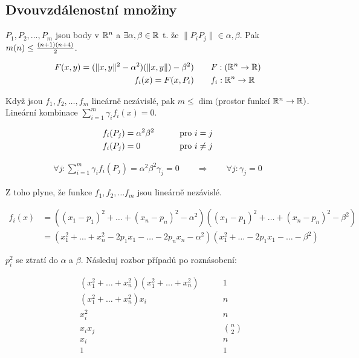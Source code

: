 \subsection{Dvouvzdálenostní množiny}


\vt $P_1, P_2, \dots, P_m$ jsou body v $\mathbb{R}^n$ a $\exists \alpha, \beta \in \mathbb{R}$ t. že $\|P_iP_j\| \in {\alpha, \beta}$. Pak $m(n) \leq {(n+1)(n+4)\over 2}$.

\dk
\begin{align}
F(x,y) = (\|x,y\|^2-\alpha^2)(\|x,y\|)-\beta^2)&\qquad F: (\mathbb{R}^n \rightarrow \mathbb{R}) \\
f_i(x) = F(x, P_i)&\qquad f_i: \mathbb{R}^n \rightarrow \mathbb{R}
\end{align}

Když jsou $f_1, f_2, \dots, f_m$ lineárně nezávislé, pak $m \leq \dim($prostor funkcí $\mathbb{R}^n \rightarrow \mathbb{R})$. Lineární kombinace $\sum_{i=1}^m \gamma_if_i(x) = 0$.

\begin{align}
f_i(P_j) &= \alpha^2\beta^2&\qquad {\rm pro}\ i=j\\
f_i(P_j) &= 0&\qquad {\rm pro}\ i\neq j
\end{align}

\begin{align}
\forall j: \sum_{i=1}^m \gamma_if_i(P_j) = \alpha^2\beta^2\gamma_j = 0 \qquad\Rightarrow\qquad \forall j: \gamma_j = 0
\end{align}

Z toho plyne, že funkce $f_1, f_2, \dots f_m$ jsou lineárně nezávislé.

\begin{align}
f_i(x) &= ((x_1-p_1)^2+\dots+(x_n-p_n)^2-\alpha^2) ((x_1-p_1)^2+\dots+(x_n-p_n)^2-\beta^2) \\
&= (x_1^2+\dots+x_n^2-2p_1x_1-\dots-2p_nx_n-\alpha^2) (x_1^2+\dots-2p_1x_1-\dots-\beta^2)
\end{align}

$p_i^2$ se ztratí do $\alpha$ a $\beta$. Následuj rozbor případů po roznásobení:

\begin{align}
	&(x_1^2+\dots+x_n^2)(x_1^2+\dots+x_n^2) &\qquad 1\\
	&(x_1^2+\dots+x_n^2)x_i &\qquad n\\
	&x_i^2 &\qquad n\\
	&x_ix_j &\qquad {n \choose 2}\\
	&x_i &\qquad n\\
	&1 &\qquad 1\\
\end{align}


